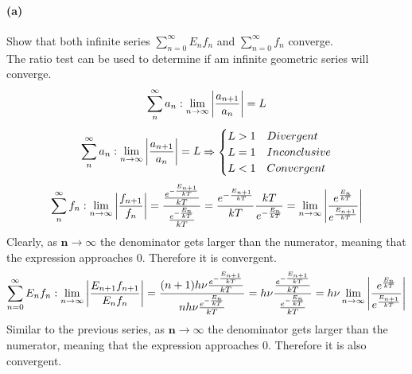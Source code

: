 \documentclass[]{article}
\begin{document}
{		\paragraph{(a)} Show that both infinite series $\sum\limits_{n=0}^{\infty} E_n f_n$ and $\sum\limits_{n=0}^{\infty} f_n$ converge. \\
		The ratio test can be used to determine if am infinite geometric series will converge.
			\begin{equation*}
				\begin{split}
					\sum\limits_{n}^{\infty} a_n : \lim_{n\to\infty} \abs{ \frac{a_{n+1}}{a_n} } = L
				\end{split}
			\end{equation*}
			\begin{equation*}
				\begin{split}
					\sum\limits_{n}^{\infty} a_n : \lim_{n\to\infty} \abs{ \frac{a_{n+1}}{a_n} } = L
				\end{split}
				\Rightarrow
				\begin{cases}
					L > 1 & Divergent \\
					L = 1 & Inconclusive \\
					L < 1 & Convergent
				\end{cases}
			\end{equation*}
			\begin{equation*}
				\begin{split}
					\sum\limits_{n}^{\infty} f_n : \lim_{n\to\infty} \abs{ \frac{f_{n+1}}{f_n} }
					= \frac{\frac{ e^{-\frac{E_{n+1}}{kT}} }{ kT }}{\frac{ e^{-\frac{E_n}{kT}} }{ kT }}
					= \frac{ e^{-\frac{E_{n+1}}{kT}} }{ kT } \frac{ kT }{ e^{-\frac{E_n}{kT}} }
					= \lim_{n\to\infty} \abs{ \frac{e^{\frac{E_{n}}{kT}}}{e^{\frac{E_{n+1}}{kT}}} } \\
				\end{split}
			\end{equation*}
			Clearly, as $\bm{n\to\infty}$ the denominator gets larger than the numerator, meaning that the expression approaches 0. Therefore it is convergent.
			\begin{equation*}
				\begin{split}
					\sum\limits_{n=0}^{\infty} E_n f_n : \lim_{n\to\infty} \abs{ \frac{E_{n+1} f_{n+1}}{E_n f_n} }
					= \frac{ (n+1)h\nu \frac{e^{-\frac{E_{n+1}}{kT}}}{kT} }{nh\nu \frac{e^{-\frac{E_n}{kT}}}{kT}}
					= h\nu \frac{\frac{e^{-\frac{E_{n+1}}{kT}}}{kT} }{\frac{e^{-\frac{E_n}{kT}}}{kT}}
					= h\nu \lim_{n\to\infty} \abs{ \frac{e^{\frac{E_{n}}{kT}}}{e^{\frac{E_{n+1}}{kT}}} } \\
				\end{split}
			\end{equation*}
			Similar to the previous series, as $\bm{n\to\infty}$ the denominator gets larger than the numerator, meaning that the expression approaches 0. Therefore it is also convergent.
}
\end{document}

